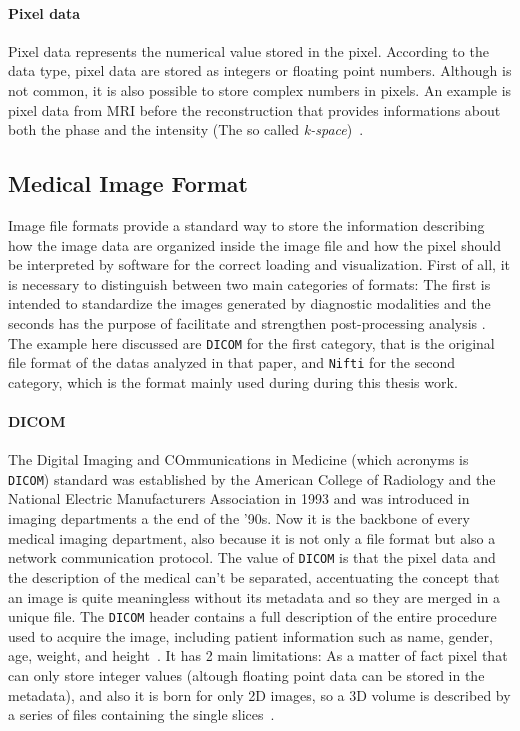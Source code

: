 \documentclass{standalone}
\begin{document}
\paragraph{Pixel data}
Pixel data represents the numerical value stored in the pixel. According to the data type, pixel data are stored as integers or floating point numbers.
Although is not common, it is also possible to store complex numbers in pixels. An example is pixel data from MRI before the reconstruction that provides informations about both the phase and the intensity (The so called \textit{k-space})~\cite{ART:Larobina}.

\subsection{Medical Image Format}
Image file formats provide a standard way to store the information describing how the image data are organized inside the image file and how the pixel should be interpreted by software for the correct loading and visualization.
First of all, it is necessary to distinguish between two main categories of formats: The first is intended to standardize the images generated by diagnostic modalities and the seconds has the purpose of facilitate and strengthen post-processing analysis \cite{ART:Larobina}. The example here discussed are \texttt{DICOM} for the first category, that is the original file format of the datas analyzed in that paper, and \texttt{Nifti} for the second category, which is the format mainly used during during this thesis work.

\paragraph{DICOM}
The Digital Imaging and COmmunications in Medicine (which acronyms is \texttt{DICOM}) standard was established by the American College of Radiology and the National Electric Manufacturers Association in 1993 and was introduced in imaging departments a the end of the '90s. Now it is the backbone of every medical imaging department, also because it is not only a file format but also a network communication protocol. The value of \texttt{DICOM} is that the pixel data and the description of the medical can't be separated, accentuating the concept that an image is quite meaningless without its metadata and so they are merged in a unique file. The \texttt{DICOM} header contains a full description of the entire procedure used to acquire the image, including patient information such as name, gender, age, weight, and height~\cite{ART:Larobina}.
It has 2 main limitations: As a matter of fact pixel that can only store integer values (altough floating point data can be stored in the metadata), and also it is born for only 2D images, so a 3D volume is described by a series of files containing the single slices~\cite{mastersthesis:Biondi}.
\end{document}
